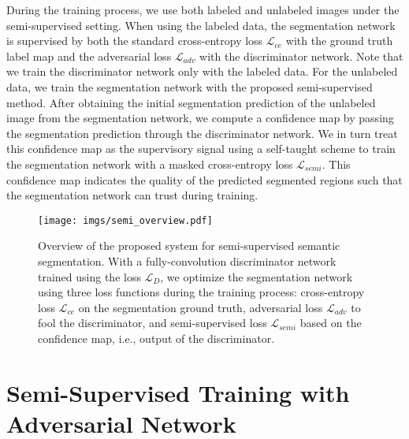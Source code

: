 \documentclass{bmvc2k}
\begin{document}
	
	During the training process, we use both labeled and unlabeled images under the semi-supervised setting.
	When using the labeled data, the segmentation network is supervised by both the standard cross-entropy loss $\mathcal{L}_{ce}$ with the ground truth label map and the adversarial loss $\mathcal{L}_{adv}$ with the discriminator network.
	Note that we train the discriminator network only with the labeled data.
	For the unlabeled data, we train the segmentation network with the proposed semi-supervised method. After obtaining the initial segmentation prediction of the unlabeled image from the segmentation network, we compute a confidence map by passing the segmentation prediction through the discriminator network.
	We in turn treat this confidence map as the supervisory signal using a self-taught 
	scheme to train the segmentation network with 
	a masked cross-entropy loss $\mathcal{L}_{semi}$.
	This confidence map indicates the quality of 
	the predicted segmented regions such that the segmentation network can trust during training.
	\begin{figure}[t]
		\centering
		\texttt{[image: imgs/semi\_overview.pdf]}\\
		\vspace{-3mm}
		\caption{Overview of the proposed system for semi-supervised semantic segmentation. With a fully-convolution discriminator network trained using the loss $\mathcal{L}_{D}$, we optimize the segmentation network using three loss functions during the training process: cross-entropy loss $\mathcal{L}_{ce}$ on the segmentation ground truth, adversarial loss $\mathcal{L}_{adv}$ to fool the discriminator, and semi-supervised loss $\mathcal{L}_{semi}$ based on the confidence map, i.e., output of the discriminator.}
		\vspace{-0.5cm}
		\label{figure: semi_overview}
	\end{figure}
	\vspace{-3mm}
	
	\section{Semi-Supervised Training with Adversarial Network}
	\vspace{-2mm}
	
\end{document}
